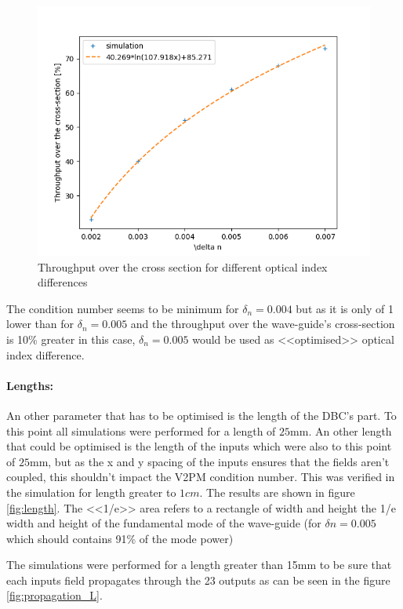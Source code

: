\begin{figure}[htbp]
  \centering
  \includegraphics[scale=.5]{picture/geometry/throughput_dn.png}
  \caption{Throughput over the cross section for different optical
    index differences}
  \label{fig:throu_dn}
\end{figure}

The condition number seems to be minimum for $\delta_n=0.004$ but as it
is only of 1 lower than for $\delta_n=0.005$ and the throughput over
the wave-guide's cross-section is 10\% greater in this case, $\delta_n=0.005$ would be used as
<<optimised>> optical index difference.

\paragraph{Lengths:}
An other parameter that has to be optimised is the length of the
DBC's part. To this point all simulations were performed for a length
of $25\si{\milli\meter}$. An other length that could be optimised is
the length of the inputs which were also to this point of
$25\si{\milli\meter}$, but as the x and y spacing of the inputs ensures
that the fields aren't coupled, this shouldn't impact the V2PM
condition number. This was verified in the simulation for length
greater to $1cm$.
The results are shown in figure \ref{fig:length}. The <<1/e>> area
refers to a rectangle of width and height the 1/e width and height of
the fundamental mode of the wave-guide (for $\delta n=0.005$ which should contains 91\% of
the mode power)

The simulations were performed for a length greater than 15mm to be
sure that each inputs field propagates through the 23 outputs as can
be seen in the figure \ref{fig:propagation_L}.


